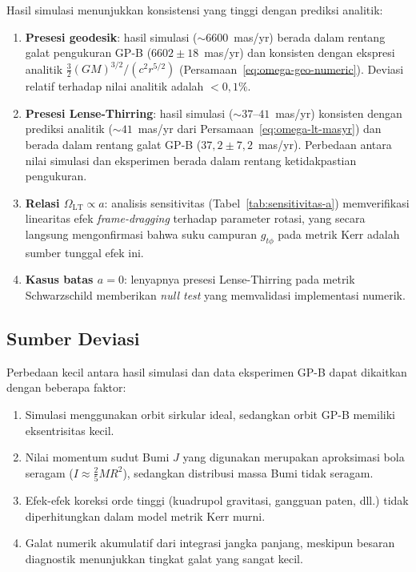 Hasil simulasi menunjukkan konsistensi yang tinggi
dengan prediksi analitik:
\begin{enumerate}
    \item \textbf{Presesi geodesik}: hasil simulasi ($\sim 6600$~mas/yr)
          berada dalam rentang galat pengukuran GP-B
          ($6602 \pm 18$~mas/yr) dan konsisten dengan
          ekspresi analitik $\frac{3}{2}(GM)^{3/2}/(c^2 r^{5/2})$
          (Persamaan~\ref{eq:omega-geo-numeric}).
          Deviasi relatif terhadap nilai analitik adalah $< 0{,}1\%$.

    \item \textbf{Presesi Lense-Thirring}: hasil simulasi ($\sim 37$--$41$~mas/yr)
          konsisten dengan prediksi analitik ($\sim 41$~mas/yr
          dari Persamaan~\ref{eq:omega-lt-masyr})
          dan berada dalam rentang galat GP-B
          ($37{,}2 \pm 7{,}2$~mas/yr).
          Perbedaan antara nilai simulasi dan eksperimen
          berada dalam rentang ketidakpastian pengukuran.

    \item \textbf{Relasi $\Omega_{\text{LT}} \propto a$}:
          analisis sensitivitas (Tabel~\ref{tab:sensitivitas-a})
          memverifikasi linearitas efek \textit{frame-dragging}
          terhadap parameter rotasi, yang secara langsung mengonfirmasi
          bahwa suku campuran $g_{t\phi}$ pada metrik Kerr
          adalah sumber tunggal efek ini.

    \item \textbf{Kasus batas $a = 0$}:
          lenyapnya presesi Lense-Thirring pada metrik Schwarzschild
          memberikan \textit{null test} yang memvalidasi
          implementasi numerik.
\end{enumerate}

\subsection{Sumber Deviasi}

Perbedaan kecil antara hasil simulasi dan data eksperimen GP-B
dapat dikaitkan dengan beberapa faktor:
\begin{enumerate}
    \item Simulasi menggunakan orbit sirkular ideal,
          sedangkan orbit GP-B memiliki eksentrisitas kecil.
    \item Nilai momentum sudut Bumi $J$ yang digunakan
          merupakan aproksimasi bola seragam
          ($I \approx \frac{2}{5}MR^2$),
          sedangkan distribusi massa Bumi tidak seragam.
    \item Efek-efek koreksi orde tinggi
          (kuadrupol gravitasi, gangguan paten, dll.)
          tidak diperhitungkan dalam model metrik Kerr murni.
    \item Galat numerik akumulatif dari integrasi jangka panjang,
          meskipun besaran diagnostik menunjukkan
          tingkat galat yang sangat kecil.
\end{enumerate}

